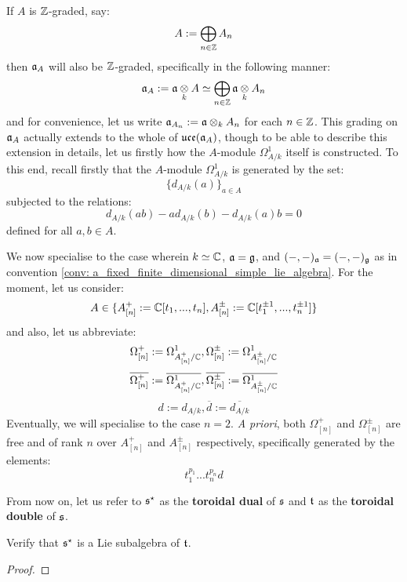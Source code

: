 \begin{remark}
                If $A$ is $\mathbb{Z}$-graded, say:
                    $$A := \bigoplus_{n \in \mathbb{Z}} A_n$$
                then $\mathfrak{a}_A$ will also be $\mathbb{Z}$-graded, specifically in the following manner:
                    $$\a_A := \a \tensor_k A \cong \bigoplus_{n \in \Z} \a \tensor_k A_n$$
                and for convenience, let us write $\a_{A_n} := \a \tensor_k A_n$ for each $n \in \mathbb{Z}$. This grading on $\mathfrak{a}_A$ actually extends to the whole of $\mathfrak{uce}(\mathfrak{a}_A)$, though to be able to describe this extension in details, let us firstly how the $A$-module $\Omega^1_{A/k}$ itself is constructed. To this end, recall firstly that the $A$-module $\Omega^1_{A/k}$ is generated by the set:
                    $$\{d_{A/k}(a)\}_{a \in A}$$
                subjected to the relations:
                    $$d_{A/k}(ab) - a d_{A/k}(b) - d_{A/k}(a) b = 0$$
                defined for all $a, b \in A$. 

                We now specialise to the case wherein $k \simeq \mathbb{C}$, $\mathfrak{a} = \mathfrak{g}$, and $(-, -)_{\mathfrak{a}} = (-, -)_{\mathfrak{g}}$ as in convention \ref{conv: a_fixed_finite_dimensional_simple_lie_algebra}. For the moment, let us consider:
                    $$A \in \{ A_{[n]}^+ := \mathbb{C}[t_1, ..., t_n], A_{[n]}^{\pm} := \mathbb{C}[t_1^{\pm 1}, ..., t_n^{\pm 1}] \}$$
                and also, let us abbreviate:
                    $$\Omega^+_{[n]} := \Omega^1_{A_{[n]}^+/\mathbb{C}}, \Omega^{\pm}_{[n]} := \Omega^1_{A_{[n]}^{\pm}/\mathbb{C}}$$
                    $$\overline{\Omega^+_{[n]}} := \overline{\Omega^1_{A_{[n]}^+/\mathbb{C}}}, \overline{\Omega^{\pm}_{[n]}} := \overline{\Omega^1_{A_{[n]}^{\pm}/\mathbb{C}}}$$
                    $$d := d_{A/k}, \overline{d} := \overline{d_{A/k}}$$
                Eventually, we will specialise to the case $n = 2$. \textit{A priori}, both $\Omega^+_{[n]}$ and $\Omega^{\pm}_{[n]}$ are free and of rank $n$ over $A_{[n]}^+$ and $A_{[n]}^{\pm}$ respectively, specifically generated by the elements:
                    $$t_1^{p_1} ... t_n^{p_n} d$$
            \end{remark}
            \begin{definition} \label{def: toroidal_duals_and_doubles}
                From now on, let us refer to $\mathfrak{s}^{\star}$ as the \textbf{toroidal dual} of $\mathfrak{s}$ and $\mathfrak{t}$ as the \textbf{toroidal double} of $\mathfrak{s}$. 
            \end{definition}
            \begin{question}
                Verify that $\mathfrak{s}^{\star}$ is a Lie subalgebra of $\mathfrak{t}$.
            \end{question}
                \begin{proof}
                    
                \end{proof}

